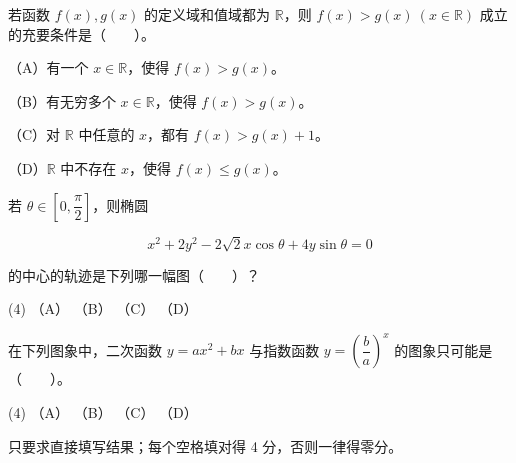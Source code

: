 \begin{question}
若函数 $f(x),g(x)$ 的定义域和值域都为 $\mathbb R$，则 $f(x)>g(x)\ (x\in\mathbb R)$ 成立的充要条件是\mbox{（　　）}。

（A）有一个 $x\in\mathbb R$，使得 $f(x)>g(x)$。

（B）有无穷多个 $x\in\mathbb R$，使得 $f(x)>g(x)$。

（C）对 $\mathbb R$ 中任意的 $x$，都有 $f(x)>g(x)+1$。

（D）$\mathbb R$ 中不存在 $x$，使得 $f(x)\le g(x)$。

\Needspace{0.4\textheight}
\end{question}
\begin{question}
若 $\theta\in\left[0,\dfrac{\pi}{2}\right]$，则椭圆

\nopagebreak[4]
\[
x^2+2y^2-2\sqrt2x\cos\theta+4y\sin\theta=0
\]

的中心的轨迹是下列哪一幅图\mbox{（　　）}？
\nopagebreak[4]
\begin{center}\end{center}
\nopagebreak[4]
\begin{gkopts}(4)
\task （A）
\task （B）
\task （C）
\task （D）
\end{gkopts}

\Needspace{0.4\textheight}
\end{question}
\begin{question}
在下列图象中，二次函数 $y=ax^2+bx$ 与指数函数 $y=\left(\dfrac{b}{a}\right)^x$ 的图象只可能是\mbox{（　　）}。
\nopagebreak[4]
\begin{center}\end{center}
\nopagebreak[4]
\begin{gkopts}(4)
\task （A）
\task （B）
\task （C）
\task （D）
\end{gkopts}

\end{question}

只要求直接填写结果；每个空格填对得 4 分，否则一律得零分。

